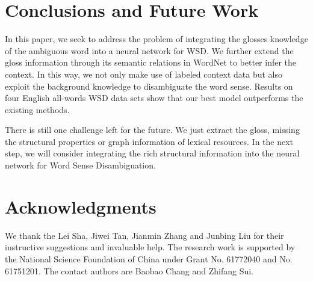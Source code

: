 \documentclass[11pt,a4paper]{article}
\begin{document}
\section{Conclusions and Future Work}
In this paper, we seek to address the problem of integrating the glosses knowledge of the ambiguous word into a neural network for WSD.
We further extend the gloss information through its semantic relations in WordNet to better infer the context.
In this way, we not only make use of labeled context data but also exploit the background knowledge to disambiguate the word sense.
Results on four English all-words WSD data sets show that our best model outperforms the existing methods.




There is still one challenge left for the future. We just extract the gloss, missing the structural properties or graph information of lexical resources. In the next step, we will consider integrating the rich structural information into the neural network for Word Sense Disambiguation.

\section*{Acknowledgments}

We thank the Lei Sha, Jiwei Tan, Jianmin Zhang and Junbing Liu for their instructive suggestions and invaluable help. 
The research work is supported by the National Science Foundation of China under Grant No. 61772040 and No. 61751201.
The contact authors are Baobao Chang and Zhifang Sui.

\nocite{Chen2015Improving}
\nocite{Navigli2009}
\nocite{Sukhbaatar2015}
\nocite{kumar2016dmn}
\nocite{xiong2016dnn1}
\nocite{sukhbaatar2015MN}
\nocite{banerjee2003extended}
\nocite{Chen2014A}
\nocite{Li2016Learning}
\nocite{rothe2015autoextend}
\nocite{camacho2015unified}
\nocite{Xia2017Deliberation}
\nocite{Sha2017RpeatedReading}





\appendix
\end{document}
